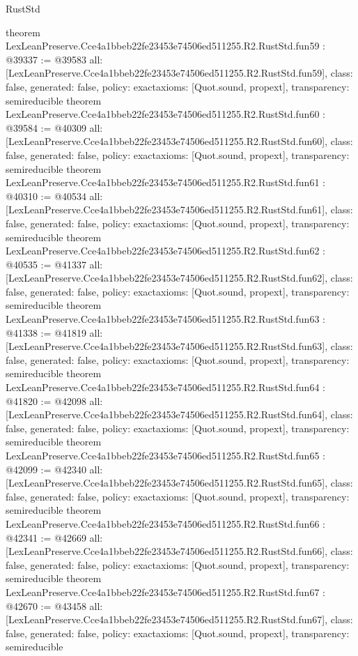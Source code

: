 \begin{lexlean}{RustStd}
\begin{coremodule}
{}
theorem LexLeanPreserve.Cce4a1bbeb22fe23453e74506ed511255.R2.RustStd.fun59 : @39337 := @39583 {
  all: [LexLeanPreserve.Cce4a1bbeb22fe23453e74506ed511255.R2.RustStd.fun59],
  class: false,
  generated: false,
  policy: exact{axioms: [Quot.sound, propext]},
  transparency: semireducible
}
theorem LexLeanPreserve.Cce4a1bbeb22fe23453e74506ed511255.R2.RustStd.fun60 : @39584 := @40309 {
  all: [LexLeanPreserve.Cce4a1bbeb22fe23453e74506ed511255.R2.RustStd.fun60],
  class: false,
  generated: false,
  policy: exact{axioms: [Quot.sound, propext]},
  transparency: semireducible
}
theorem LexLeanPreserve.Cce4a1bbeb22fe23453e74506ed511255.R2.RustStd.fun61 : @40310 := @40534 {
  all: [LexLeanPreserve.Cce4a1bbeb22fe23453e74506ed511255.R2.RustStd.fun61],
  class: false,
  generated: false,
  policy: exact{axioms: [Quot.sound, propext]},
  transparency: semireducible
}
theorem LexLeanPreserve.Cce4a1bbeb22fe23453e74506ed511255.R2.RustStd.fun62 : @40535 := @41337 {
  all: [LexLeanPreserve.Cce4a1bbeb22fe23453e74506ed511255.R2.RustStd.fun62],
  class: false,
  generated: false,
  policy: exact{axioms: [Quot.sound, propext]},
  transparency: semireducible
}
theorem LexLeanPreserve.Cce4a1bbeb22fe23453e74506ed511255.R2.RustStd.fun63 : @41338 := @41819 {
  all: [LexLeanPreserve.Cce4a1bbeb22fe23453e74506ed511255.R2.RustStd.fun63],
  class: false,
  generated: false,
  policy: exact{axioms: [Quot.sound, propext]},
  transparency: semireducible
}
theorem LexLeanPreserve.Cce4a1bbeb22fe23453e74506ed511255.R2.RustStd.fun64 : @41820 := @42098 {
  all: [LexLeanPreserve.Cce4a1bbeb22fe23453e74506ed511255.R2.RustStd.fun64],
  class: false,
  generated: false,
  policy: exact{axioms: [Quot.sound, propext]},
  transparency: semireducible
}
theorem LexLeanPreserve.Cce4a1bbeb22fe23453e74506ed511255.R2.RustStd.fun65 : @42099 := @42340 {
  all: [LexLeanPreserve.Cce4a1bbeb22fe23453e74506ed511255.R2.RustStd.fun65],
  class: false,
  generated: false,
  policy: exact{axioms: [Quot.sound, propext]},
  transparency: semireducible
}
theorem LexLeanPreserve.Cce4a1bbeb22fe23453e74506ed511255.R2.RustStd.fun66 : @42341 := @42669 {
  all: [LexLeanPreserve.Cce4a1bbeb22fe23453e74506ed511255.R2.RustStd.fun66],
  class: false,
  generated: false,
  policy: exact{axioms: [Quot.sound, propext]},
  transparency: semireducible
}
theorem LexLeanPreserve.Cce4a1bbeb22fe23453e74506ed511255.R2.RustStd.fun67 : @42670 := @43458 {
  all: [LexLeanPreserve.Cce4a1bbeb22fe23453e74506ed511255.R2.RustStd.fun67],
  class: false,
  generated: false,
  policy: exact{axioms: [Quot.sound, propext]},
  transparency: semireducible
}
\end{coremodule}
\end{lexlean}
